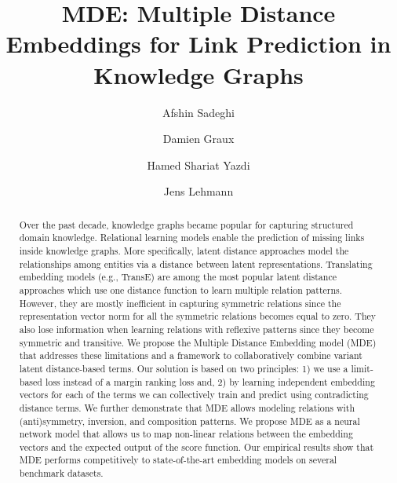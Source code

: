 \documentclass{ecai}
\begin{document}
\title{MDE: Multiple Distance Embeddings for Link Prediction in Knowledge Graphs}
\author{Afshin Sadeghi
    \and
    Damien Graux
    \and
    Hamed Shariat Yazdi
    \and
    Jens Lehmann
}
\maketitle

\begin{abstract}
Over the past decade, knowledge graphs became popular for capturing structured domain knowledge. 
Relational learning models enable the prediction of missing links inside knowledge graphs. More specifically, latent distance approaches model the relationships among entities via a distance between latent representations.
Translating embedding models (e.g., TransE) are among the most popular latent distance approaches which use one distance function to learn multiple relation patterns. 
However, they are mostly inefficient in capturing symmetric relations since the representation vector norm for all the symmetric relations becomes equal to zero. They also lose information when learning relations with reflexive patterns since they become symmetric and transitive.
We propose the Multiple Distance Embedding model (MDE) that addresses these limitations and a framework to collaboratively combine variant latent distance-based terms.
Our solution is based on two principles: 1) we use a limit-based loss instead of a margin ranking loss and, 2) by learning independent embedding vectors for each of the terms we can collectively train and predict using contradicting distance terms.
We further demonstrate that MDE allows modeling relations with (anti)symmetry, inversion, and composition patterns. We propose MDE as a neural network model that allows us to map non-linear relations between the embedding vectors and the expected output of the score function.
Our empirical results show that MDE performs competitively to state-of-the-art embedding models on several benchmark datasets.

\end{abstract}
\end{document}
